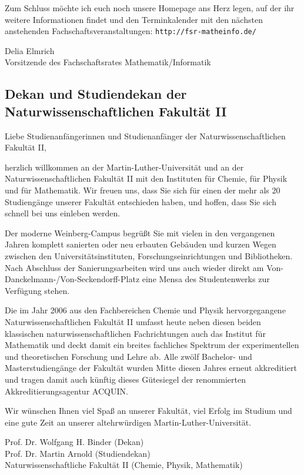 Zum Schluss möchte ich euch noch unsere Homepage ans Herz legen, auf der ihr weitere Informationen findet und den Terminkalender mit den nächsten anstehenden Fachschaftsveranstaltungen: \texttt{http://fsr-matheinfo.de/}

Delia Elmrich\\
Vorsitzende des Fachschaftsrates Mathematik/Informatik


\subsection{Dekan und Studiendekan der Naturwissenschaftlichen Fakultät II}

Liebe Studienanfängerinnen und Studienanfänger der Naturwissenschaftlichen
Fakultät II,

herzlich willkommen an der Martin-Luther-Universität und an der Naturwissenschaftlichen Fakultät II mit den Instituten für Chemie, für Physik und für Mathematik. Wir freuen uns, dass Sie sich für einen der mehr als 20 Studiengänge unserer Fakultät entschieden haben, und hoffen, dass Sie sich schnell bei uns einleben werden.

Der moderne Weinberg-Campus begrüßt Sie mit vielen in den vergangenen Jahren komplett sanierten oder neu erbauten Gebäuden und kurzen Wegen zwischen den Universitätsinstituten, Forschungseinrichtungen und Bibliotheken. Nach Abschluss der Sanierungsarbeiten wird uns auch wieder direkt am Von-Danckelmann-/Von-Seckendorff-Platz eine Mensa des Studentenwerks zur Verfügung stehen.

Die im Jahr 2006 aus den Fachbereichen Chemie und Physik hervorgegangene Naturwissenschaftlichen Fakultät II umfasst heute neben diesen beiden klassischen naturwissenschaftlichen Fachrichtungen auch das Institut für Mathematik und deckt damit ein breites fachliches Spektrum der experimentellen und theoretischen Forschung und Lehre ab. Alle zwölf Bachelor- und Masterstudiengänge der Fakultät wurden Mitte diesen Jahres erneut akkreditiert und tragen damit auch künftig dieses Gütesiegel der renommierten Akkreditierungsagentur ACQUIN.
 
Wir wünschen Ihnen viel Spaß an unserer Fakultät, viel Erfolg im Studium und eine gute Zeit an unserer altehrwürdigen Martin-Luther-Universität.
 
Prof. Dr. Wolfgang H. Binder (Dekan)\\
Prof. Dr. Martin Arnold (Studiendekan)\\
Naturwissenschaftliche Fakultät II (Chemie, Physik, Mathematik)


